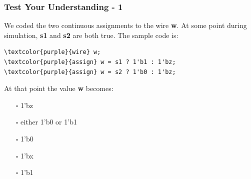 \documentclass[t, notes, xcolor=table]{beamer}
\begin{document}
\begin{frame}[fragile]
\frametitle{Test Your Understanding - 1}

We coded the two continuous assignments to the wire \textbf{w}. At some point during simulation, \textbf{s1} and \textbf{s2} are both true. The sample code is:
\begin{Verbatim}[commandchars=\\\{\}, tabsize=2]
\textcolor{purple}{wire} w;
\textcolor{purple}{assign} w = s1 ? 1'b1 : 1'bz;
\textcolor{purple}{assign} w = s2 ? 1'b0 : 1'bz;
\end{Verbatim}
At that point the value \textbf{w} becomes:
\begin{itemize}
\item[$\square$] 1'bz
\item[$\square$] either 1'b0 or 1'b1
\item[$\square$] 1'b0
\item[$\square$] 1'bx
\item[$\square$] 1'b1
\end{itemize}
\end{frame}
\end{document}
